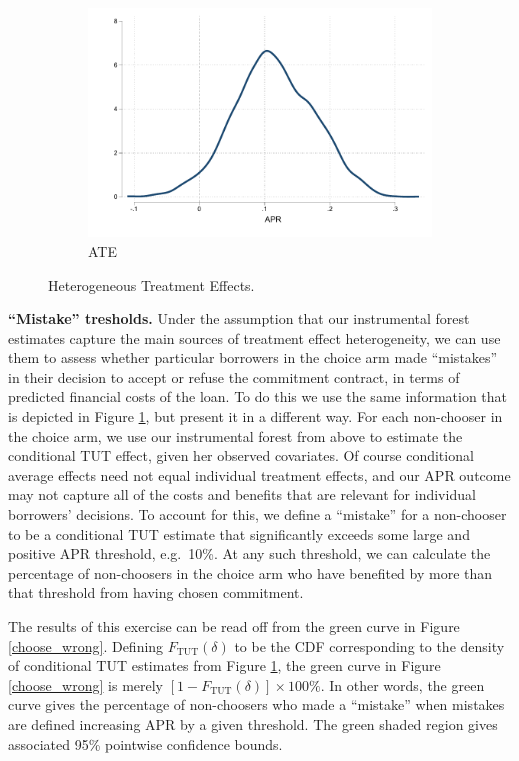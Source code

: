 \documentclass[ecta,nameyear,final]{econsocart}
\begin{document}
\begin{figure}
\begin{center}
\begin{subfigure}{.32\textwidth}
        \includegraphics[width=\textwidth]{Figuras/he_dist_tau_hat_eff.pdf}
        \caption{ATE}
    \end{subfigure} 
    \end{center}
    \caption{Heterogeneous Treatment Effects.}
    \label{heterogeneous_effects}    
\end{figure}
\noindent \textbf{``Mistake'' tresholds.} Under the assumption that our instrumental forest estimates capture the main sources of treatment effect heterogeneity, we can use them to assess whether particular borrowers in the choice arm made ``mistakes'' in their decision to accept or refuse the commitment contract, in terms of predicted financial costs of the loan.
To do this we use the same information that is depicted in Figure \ref{heterogeneous_effects}, but present it in a different way.
For each non-chooser in the choice arm, we use our instrumental forest from above to estimate the conditional TUT effect, given her observed covariates.
Of course conditional average effects need not equal individual treatment effects, and our APR outcome may not capture all of the costs and benefits that are relevant for individual borrowers' decisions.
To account for this, we define a ``mistake'' for a non-chooser to be a conditional TUT estimate that significantly exceeds some large and positive APR threshold, e.g.\ 10\%. 
At any such threshold, we can calculate the percentage of non-choosers in the choice arm who have benefited by more than that threshold from having chosen commitment. 


The results of this exercise can be read off from the green curve in Figure \ref{choose_wrong}.
Defining $F_{\text{TUT}}(\delta)$ to be the CDF corresponding to the density of conditional TUT estimates from Figure \ref{heterogeneous_effects}, the green curve in Figure \ref{choose_wrong} is merely $[1 - F_{\text{TUT}}(\delta)] \times 100\%$.
In other words, the green curve gives the percentage of non-choosers who made a ``mistake'' when mistakes are defined increasing APR by a given threshold.
The green shaded region gives associated 95\% pointwise confidence bounds.
\end{document}
